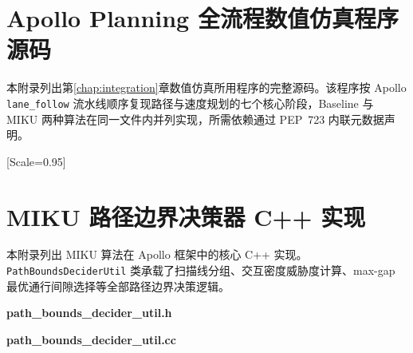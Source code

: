 \appendix
{}

\chapter{Apollo Planning 全流程数值仿真程序源码}
\label{appendix:apollo-pipeline}

\songti
本附录列出第\ref{chap:integration}章数值仿真所用程序的完整源码。该程序按 Apollo \texttt{lane\_follow} 流水线顺序复现路径与速度规划的七个核心阶段，Baseline 与 MIKU 两种算法在同一文件内并列实现，所需依赖通过 PEP~723 内联元数据声明。

\newfontfamily{}[Scale=0.95]


\chapter{MIKU 路径边界决策器 C++ 实现}
\label{appendix:path-bounds}

\songti
本附录列出 MIKU 算法在 Apollo 框架中的核心 C++ 实现。\texttt{PathBoundsDeciderUtil} 类承载了扫描线分组、交互密度威胁度计算、max-gap 最优通行间隙选择等全部路径边界决策逻辑。

\vspace{6pt}
\noindent\textbf{path\_bounds\_decider\_util.h}



\vspace{6pt}
\noindent\textbf{path\_bounds\_decider\_util.cc}

